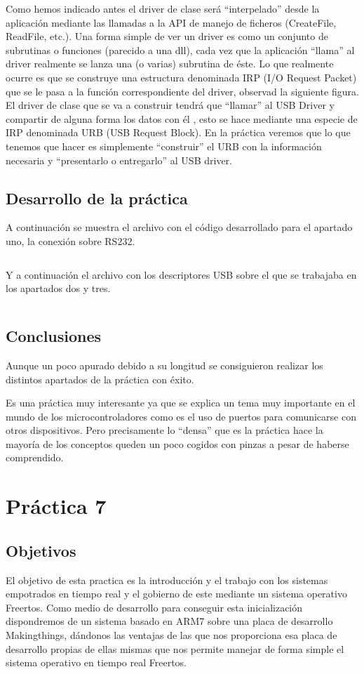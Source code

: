 \documentclass[a4paper, 11pt]{article}
\begin{document}
Como hemos indicado antes el driver de clase será ``interpelado''
desde la aplicación mediante las llamadas a la API de manejo de
ficheros (CreateFile, ReadFile, etc.). Una forma simple de ver un
driver es como un conjunto de subrutinas o funciones (parecido a
una dll), cada vez que la aplicación ``llama'' al driver realmente
se lanza una (o varias) subrutina de éste. Lo que realmente ocurre
es que se construye una estructura denominada IRP (I/O Request
Packet) que se le pasa a la función correspondiente del driver,
observad la siguiente figura. El driver de clase que se va a
construir tendrá que ``llamar'' al USB Driver y compartir de alguna
forma los datos con él , esto se hace mediante una especie de IRP
denominada URB (USB Request Block). En la práctica veremos que lo
que tenemos que hacer es simplemente ``construir'' el URB con la
información necesaria y ``presentarlo o entregarlo'' al USB driver.

\subsection{Desarrollo de la práctica}
A continuación se muestra el archivo con el código desarrollado
para el apartado uno, la conexión sobre RS232.
\inputminted[tabsize=4, fontsize=\small]{c}{prac6-main.c}

Y a continuación el archivo con los descriptores USB sobre el que
se trabajaba en los apartados dos y tres.
\inputminted[tabsize=4, fontsize=\small]{c}{prac6-desc.c}

\subsection{Conclusiones}
Aunque un poco apurado debido a su longitud se consiguieron
realizar los distintos apartados de la práctica con éxito.

Es una práctica muy interesante ya que se explica un tema muy
importante en el mundo de los microcontroladores como es el uso de
puertos para comunicarse con otros dispositivos.  Pero precisamente
lo ``densa'' que es la práctica hace la mayoría de los conceptos
queden un poco cogidos con pinzas a pesar de haberse comprendido.

\section{Práctica 7}

\subsection{Objetivos}
El objetivo de esta practica es la introducción y el trabajo con
los sistemas empotrados en tiempo real y el gobierno de este
mediante un sistema operativo Freertos.  Como medio de desarrollo
para conseguir esta inicialización dispondremos de un sistema
basado en ARM7 sobre una placa de desarrollo Makingthings,
dándonos las ventajas de las que nos proporciona esa placa de
desarrollo propias de ellas mismas que nos permite manejar de
forma simple el sistema operativo en tiempo real Freertos.
\end{document}
